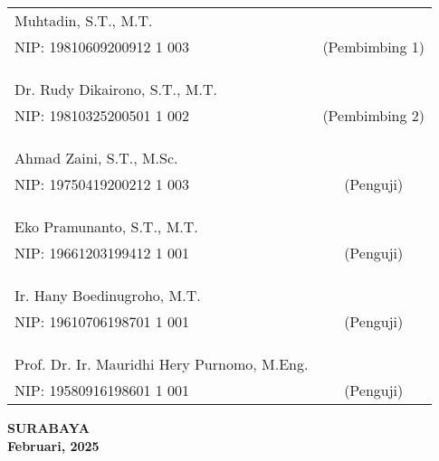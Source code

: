 \noindent
\begin{tabularx}{\textwidth}{X c}
  Muhtadin, S.T., M.T.      &                 \\
  NIP: 19810609200912 1 003    & (Pembimbing 1)    \\
                                &                 \\
                                &                 \\
                                &                 \\
  Dr. Rudy Dikairono, S.T., M.T.      &                 \\
  NIP: 19810325200501 1 002    & (Pembimbing 2)    \\
                                &                 \\
                                &                 \\
                                &                 \\
  Ahmad Zaini, S.T., M.Sc. &                 \\
  NIP: 19750419200212 1 003    & (Penguji) \\
                                &                 \\
                                &                 \\
                                &                 \\
  Eko Pramunanto, S.T., M.T. &                 \\
  NIP: 19661203199412 1 001    & (Penguji) \\
                                &                 \\
                                &                 \\
                                &                 \\
  Ir. Hany Boedinugroho, M.T. &                 \\
  NIP: 19610706198701 1 001    & (Penguji) \\
                                &                 \\
                                &                 \\
                                &                 \\
  Prof. Dr. Ir. Mauridhi Hery Purnomo, M.Eng. &                 \\
  NIP: 19580916198601 1 001    & (Penguji) \\
\end{tabularx}
\endgroup

\vspace{\fill}

\begin{center}
  \textbf{SURABAYA} \\
  \textbf{Februari, 2025}
\end{center}
\endgroup
